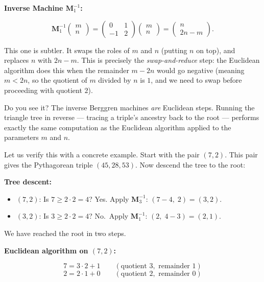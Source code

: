 \textbf{Inverse Machine \(\mathbf{M}_1^{-1}\):}

\[
\mathbf{M}_1^{-1} \begin{pmatrix} m \\ n \end{pmatrix} = \begin{pmatrix} 0 & 1 \\ -1 & 2 \end{pmatrix} \begin{pmatrix} m \\ n \end{pmatrix} = \begin{pmatrix} n \\ 2n - m \end{pmatrix}.
\]

This one is subtler. It swaps the roles of \(m\) and \(n\) (putting \(n\) on top), and replaces \(n\) with \(2n - m\). This is precisely the \emph{swap-and-reduce} step: the Euclidean algorithm does this when the remainder \(m - 2n\) would go negative (meaning \(m < 2n\), so the quotient of \(m\) divided by \(n\) is \(1\), and we need to swap before proceeding with quotient \(2\)).

Do you see it? The inverse Berggren machines \emph{are} Euclidean steps. Running the triangle tree in reverse --- tracing a triple's ancestry back to the root --- performs exactly the same computation as the Euclidean algorithm applied to the parameters \(m\) and \(n\).

Let us verify this with a concrete example. Start with the pair \((7, 2)\). This pair gives the Pythagorean triple \((45, 28, 53)\). Now descend the tree to the root:

\textbf{Tree descent:}

\begin{itemize}

\item
  \((7, 2)\): Is \(7 \ge 2 \cdot 2 = 4\)? Yes. Apply \(\mathbf{M}_3^{-1}\): \((7 - 4,\; 2) = (3, 2)\).
\item
  \((3, 2)\): Is \(3 \ge 2 \cdot 2 = 4\)? No.~Apply \(\mathbf{M}_1^{-1}\): \((2,\; 4 - 3) = (2, 1)\).
\end{itemize}

We have reached the root in two steps.

\textbf{Euclidean algorithm on \((7, 2)\):}

\[
7 = 3 \cdot 2 + 1 \qquad (\text{quotient } 3, \text{ remainder } 1)
\] \[
2 = 2 \cdot 1 + 0 \qquad (\text{quotient } 2, \text{ remainder } 0)
\]

